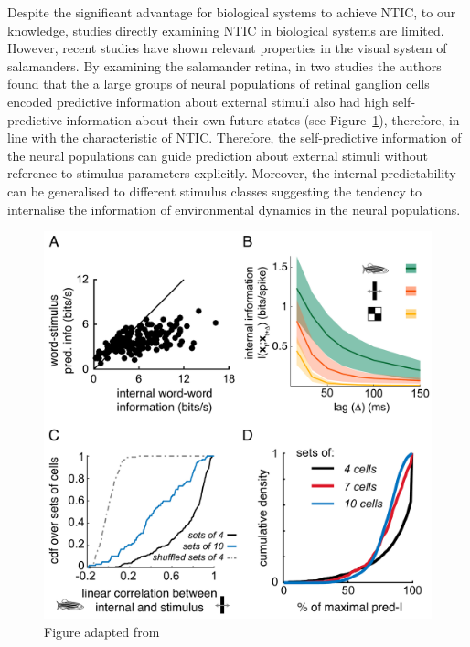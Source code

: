 \documentclass[utf8]{article}
\begin{document}
			Despite the significant advantage for biological systems to achieve NTIC, to our knowledge, studies directly examining NTIC in biological systems are limited. However,  recent studies have shown relevant properties in the visual system of salamanders. By examining the salamander retina, in two studies \citep{Palmer2015, sederberg2018learning} the authors found that the a large groups of neural populations of retinal ganglion cells encoded predictive information about external stimuli also had high self-predictive information about their own future states (see Figure~\ref{fig:sederberg2018learning}), therefore, in line with the characteristic of NTIC. Therefore, the self-predictive information of the neural populations can guide prediction about external stimuli without reference to stimulus parameters explicitly. Moreover, the internal predictability can be generalised to different stimulus classes suggesting the tendency to internalise the information of environmental dynamics in the neural populations. 


			\begin{figure}[H]
				\includegraphics[width=\textwidth]{WritingMaterials/Fig_Sederberg/Fig_Sederberg.pdf}
				\caption{Figure adapted from \cite{sederberg2018learning}}
				\label{fig:sederberg2018learning}
			\end{figure}
\end{document}
